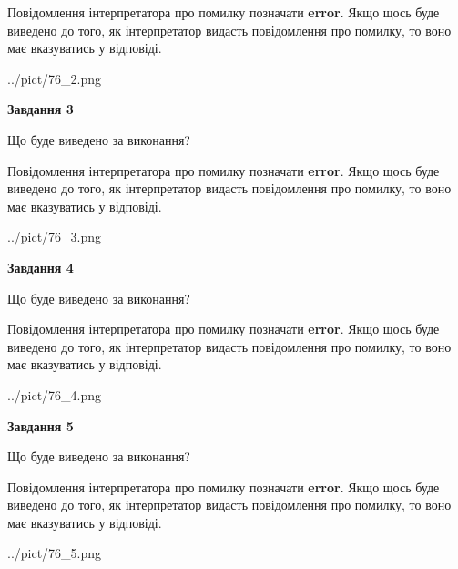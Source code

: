 \documentclass[12pt, ukrainian]{article}
\begin{document}
{\begin {large}
Повідомлення інтерпретатора про помилку позначати \textbf{error}.
Якщо щось буде виведено до того, як інтерпретатор видасть повідомлення про помилку, 
то воно має вказуватись у відповіді. \par


\begin{center}
	{../pict/76_2.png}
\end{center}
\newpage

{\begin {center}\textbf{Завдання 3}\end {center}}\par
Що буде виведено за виконання?

Повідомлення інтерпретатора про помилку позначати \textbf{error}.
Якщо щось буде виведено до того, як інтерпретатор видасть повідомлення про помилку, 
то воно має вказуватись у відповіді. \par


\begin{center}
	{../pict/76_3.png}
\end{center}
\newpage

{\begin {center}\textbf{Завдання 4}\end {center}}\par
Що буде виведено за виконання?

Повідомлення інтерпретатора про помилку позначати \textbf{error}.
Якщо щось буде виведено до того, як інтерпретатор видасть повідомлення про помилку, 
то воно має вказуватись у відповіді. \par


\begin{center}
	{../pict/76_4.png}
\end{center}
\newpage

{\begin {center}\textbf{Завдання 5}\end {center}}\par
Що буде виведено за виконання?

Повідомлення інтерпретатора про помилку позначати \textbf{error}.
Якщо щось буде виведено до того, як інтерпретатор видасть повідомлення про помилку, 
то воно має вказуватись у відповіді. \par


\begin{center}
	{../pict/76_5.png}
\end{center}
\newpage


\end{large}}
\end{document}
